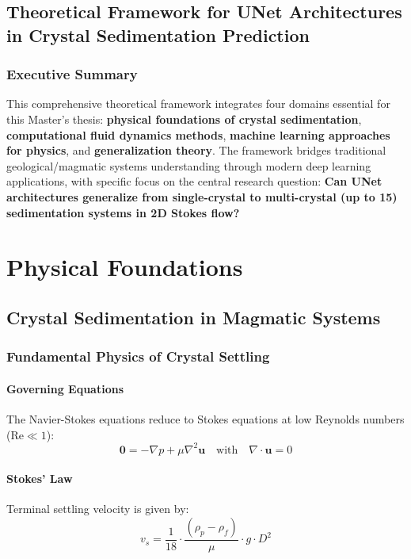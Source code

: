 

\chapter{Theoretical Framework for UNet Architectures in Crystal Sedimentation Prediction}

\section{Executive Summary}

This comprehensive theoretical framework integrates four domains essential for this Master's thesis: \textbf{physical foundations of crystal sedimentation}, \textbf{computational fluid dynamics methods}, \textbf{machine learning approaches for physics}, and \textbf{generalization theory}. The framework bridges traditional geological/magmatic systems understanding through modern deep learning applications, with specific focus on the central research question: \textbf{Can UNet architectures generalize from single-crystal to multi-crystal (up to 15) sedimentation systems in 2D Stokes flow?}

\part{Physical Foundations}

\chapter{Crystal Sedimentation in Magmatic Systems}

\section{Fundamental Physics of Crystal Settling}

\subsection{Governing Equations}
The Navier-Stokes equations reduce to Stokes equations at low Reynolds numbers ($\text{Re} \ll 1$):
\begin{equation}
\mathbf{0} = -\nabla p + \mu \nabla^2 \mathbf{u} \quad \text{with} \quad \nabla \cdot \mathbf{u} = 0
\end{equation}

\subsection{Stokes' Law}
Terminal settling velocity is given by:
\begin{equation}
v_s = \frac{1}{18} \cdot \frac{(\rho_p - \rho_f)}{\mu} \cdot g \cdot D^2
\end{equation}

